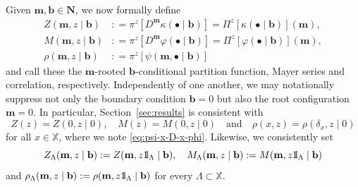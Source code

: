 \documentclass[10pt,a4paper]{amsart}
\newcommand{\X}{\mathbb X}
\def\1{{\mathchoice {1\mskip-4mu\mathrm l}      
{1\mskip-4mu\mathrm l}
{1\mskip-4.5mu\mathrm l} {1\mskip-5mu\mathrm l}}}
\begin{document}
Given $\mathbf m, \mathbf b \in \mathbf N$, we now formally define
\begin{align*}
	Z(\mathbf m, z \mid \mathbf b) & : = \pi^z[D^\mathbf m \kappa(\bullet \mid \mathbf b)] = \Pi^z[\kappa(\bullet \mid \mathbf b)](\mathbf m), \\
	M(\mathbf m, z \mid \mathbf b) & : = \pi^z[D^\mathbf m \varphi(\bullet \mid \mathbf b)] = \Pi^z[\varphi(\bullet \mid \mathbf b)](\mathbf m), \\
	\rho(\mathbf m, z \mid \mathbf b) & : = \pi^z[\psi(\mathbf m, \bullet \mid \mathbf b)]
\end{align*}
and call these the $\mathbf m$-rooted $\mathbf b$-conditional partition function, Mayer series and correlation, respectively. 
Independently of one another, we may notationally suppress not only the boundary condition $\mathbf b = 0$ but also the root configuration $\mathbf m = 0$. 
In particular, Section~\ref{sec:results} is consistent with
\[
	Z(z) = Z(0, z \mid 0), \quad M(z) = M(0, z \mid 0) \quad \text{and} \quad \rho(x, z) = \rho(\delta_x, z \mid 0)
\]
for all $x \in \X$, where we note \eqref{eq:psi-x-D-x-phi}. 
Likewise, we consistently set
\[
	Z_\Lambda(\mathbf m, z \mid \mathbf b) : = Z(\mathbf m, z \1_\Lambda \mid \mathbf b), \quad M_\Lambda (\mathbf m, z \mid \mathbf b) : = M(\mathbf m, z \1_\Lambda \mid \mathbf b)
\]
and $\rho_\Lambda(\mathbf m, z \mid \mathbf b) : = \rho(\mathbf m, z \1_\Lambda \mid \mathbf b)$ for every $\Lambda \subset \X$.
\end{document}
